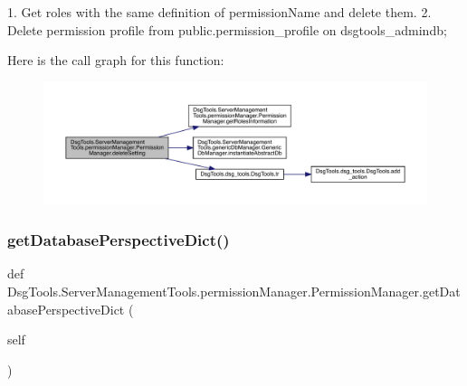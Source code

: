 \begin{DoxyVerb}1. Get roles with the same definition of permissionName and delete them.
2. Delete permission profile from public.permission_profile on dsgtools_admindb;
\end{DoxyVerb}
 Here is the call graph for this function\+:
\nopagebreak
\begin{figure}[H]
\begin{center}
\leavevmode
\includegraphics[width=350pt]{class_dsg_tools_1_1_server_management_tools_1_1permission_manager_1_1_permission_manager_abee84dfa73d922862781908b64c8258a_cgraph}
\end{center}
\end{figure}
\mbox{\label{class_dsg_tools_1_1_server_management_tools_1_1permission_manager_1_1_permission_manager_a11c1a21b45f76b92225d78962b8b8e55}} 
\subsubsection{\texorpdfstring{get\+Database\+Perspective\+Dict()}{getDatabasePerspectiveDict()}}
{\footnotesize\ttfamily def Dsg\+Tools.\+Server\+Management\+Tools.\+permission\+Manager.\+Permission\+Manager.\+get\+Database\+Perspective\+Dict (\begin{DoxyParamCaption}\item[{}]{self }\end{DoxyParamCaption})}

